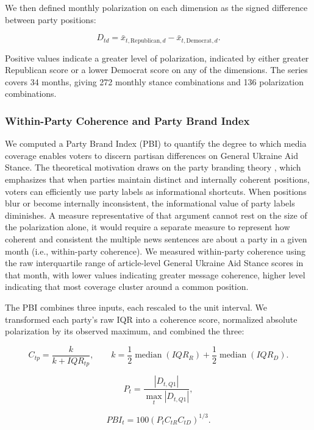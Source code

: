 We then defined monthly polarization on each dimension as the signed difference between party positions:

\[D_{td}={\bar{x}}_{t,\mathrm{Republican},d}-{\bar{x}}_{t,\mathrm{Democrat},d}.\]

Positive values indicate a greater level of polarization, indicated by either greater Republican score or a lower Democrat score on any of the dimensions. The series covers 34 months, giving 272 monthly stance combinations and 136 polarization combinations.

\subsubsection{Within-Party Coherence and Party Brand Index}

We computed a Party Brand Index (PBI) to quantify the degree to which media coverage enables voters to discern partisan differences on General Ukraine Aid Stance. The theoretical motivation draws on the party branding theory \citep{lupuPartyBrandsPartisanship2013,lupuPartyBrandsCrisis2016,pablofernandez-vazquezItMovesEffect2014}, which emphasizes that when parties maintain distinct and internally coherent positions, voters can efficiently use party labels as informational shortcuts. When positions blur or become internally inconsistent, the informational value of party labels diminishes. A measure representative of that argument cannot rest on the size of the polarization alone, it would require a separate measure to represent how coherent and consistent the multiple news sentences are about a party in a given month (i.e., within-party coherence). We measured within-party coherence using the raw interquartile range of article-level General Ukraine Aid Stance scores in that month, with lower values indicating greater message coherence, higher level indicating that most coverage cluster around a common position.

The PBI combines three inputs, each rescaled to the unit interval. We transformed each party's raw IQR into a coherence score, normalized absolute polarization by its observed maximum, and combined the three:

\[C_{tp} = \frac{k}{k + IQR_{tp}}, \quad\quad k=\frac{1}{2}\operatorname{median}\left( IQR_{R} \right) + \frac{1}{2}\operatorname{median}\left( IQR_{D} \right).\]

\[P_{t} = \frac{\left| D_{t,Q1} \right|}{\max_{t}\left| D_{t,Q1} \right|},\]

\[PBI_{t} = 100\left( P_{t} C_{tR} C_{tD} \right)^{1/3}.\]

